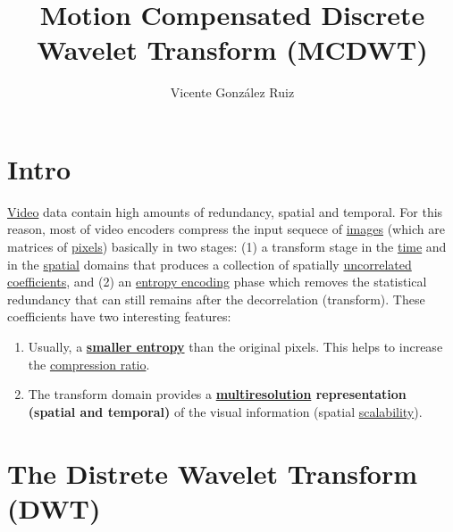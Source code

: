 
\title{Motion Compensated Discrete Wavelet Transform (MCDWT)}

\author{Vicente González Ruiz}

\maketitle
\tableofcontents

\section{Intro}

\href{https://en.wikipedia.org/wiki/Video}{Video} data contain high
amounts of redundancy, spatial and temporal. For this reason, most of
video encoders compress the input sequece of
\href{https://en.wikipedia.org/wiki/Digital_image}{images} (which are
matrices of \href{https://en.wikipedia.org/wiki/Pixel}{pixels})
basically in two stages: (1) a transform stage in the
\href{https://en.wikipedia.org/wiki/Time_domain}{time} and in the
\href{https://www.quora.com/What-is-spatial-domain-in-image-processing}{spatial}
domains that produces a collection of spatially
\href{https://en.wikipedia.org/wiki/Decorrelation}{uncorrelated}
\href{https://en.wikipedia.org/wiki/Discrete_wavelet_transform}{coefficients},
and (2) an
\href{https://en.wikipedia.org/wiki/Entropy_encoding}{entropy
  encoding} phase which removes the statistical redundancy that can
still remains after the decorrelation (transform). These coefficients
have two interesting features:
\begin{enumerate}
\item Usually, a \textbf{
  \href{https://vicente-gonzalez-ruiz.github.io/symbol_compression/}{smaller
  entropy}} than the original pixels. This helps to increase
  the \href{https://en.wikipedia.org/wiki/Data_compression_ratio}{compression
  ratio}.
\item The transform domain provides a
  \textbf{\href{https://en.wikipedia.org/wiki/Image_resolution}{multiresolution}
    representation (spatial and temporal)} of the visual information (spatial
  \href{http://inst.eecs.berkeley.edu/~ee290t/sp04/lectures/videowavelet_UCB1-3.pdf}{scalability}).
\end{enumerate}


\section{The Distrete Wavelet Transform (DWT)}

